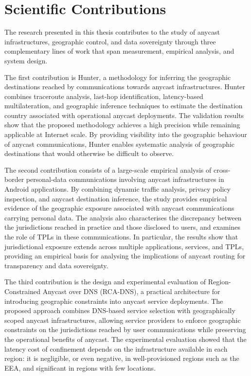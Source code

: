 \section{Scientific Contributions}
\label{sc:conclusion_contributions}

The research presented in this thesis contributes to the study of anycast infrastructures, geographic control, and data sovereignty through three complementary lines of work that span measurement, empirical analysis, and system design.

The first contribution is Hunter, a methodology for inferring the geographic destinations reached by communications towards anycast infrastructures. Hunter combines traceroute analysis, last-hop identification, latency-based multilateration, and geographic inference techniques to estimate the destination country associated with operational anycast deployments. The validation results show that the proposed methodology achieves a high precision while remaining applicable at Internet scale. By providing visibility into the geographic behaviour of anycast communications, Hunter enables systematic analysis of geographic destinations that would otherwise be difficult to observe.

The second contribution consists of a large-scale empirical analysis of cross-border personal-data communications involving anycast infrastructures in Android applications. By combining dynamic traffic analysis, privacy policy inspection, and anycast destination inference, the study provides empirical evidence of the geographic exposure associated with anycast communications carrying personal data. The analysis also characterises the discrepancy between the jurisdictions reached in practice and those disclosed to users, and examines the role of TPLs in these communications. In particular, the results show that jurisdictional exposure extends across multiple applications, services, and TPLs, providing an empirical basis for analysing the implications of anycast routing for transparency and data sovereignty.

The third contribution is the design and experimental evaluation of Region-Constrained Anycast over DNS (RCA-DNS), a practical architecture for introducing geographic constraints into anycast service deployments. The proposed approach combines DNS-based service selection with geographically scoped anycast infrastructures, allowing service providers to enforce geographic constraints on the jurisdictions reached by user communications while preserving the operational benefits of anycast. The experimental evaluation showed that the latency cost of confinement depends on the infrastructure available in each region: it is negligible, or even negative, in well-provisioned regions such as the EEA, and significant in regions with few locations.

